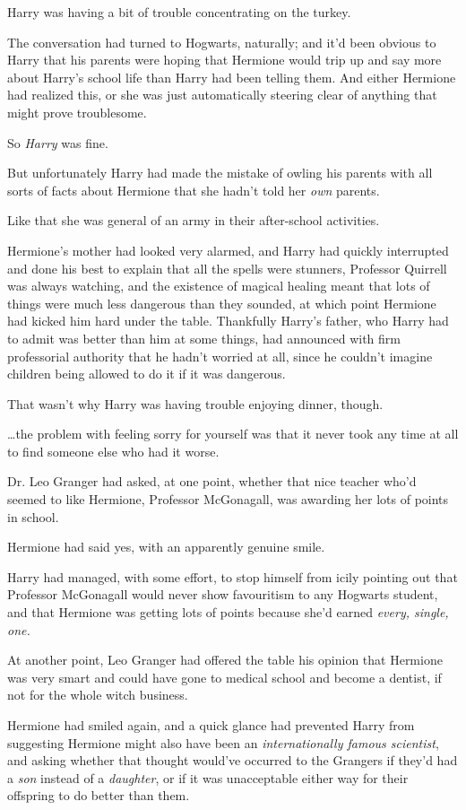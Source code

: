 Harry was having a bit of trouble concentrating on the turkey.

The conversation had turned to Hogwarts, naturally; and it'd been obvious to
Harry that his parents were hoping that Hermione would trip up and say more
about Harry's school life than Harry had been telling them. And either Hermione
had realized this, or she was just automatically steering clear of anything
that might prove troublesome.

So \emph{Harry} was fine.

But unfortunately Harry had made the mistake of owling his parents with all
sorts of facts about Hermione that she hadn't told her \emph{own} parents.

Like that she was general of an army in their after-school activities.

Hermione's mother had looked very alarmed, and Harry had quickly interrupted
and done his best to explain that all the spells were stunners, Professor
Quirrell was always watching, and the existence of magical healing meant that
lots of things were much less dangerous than they sounded, at which point
Hermione had kicked him hard under the table. Thankfully Harry's father, who
Harry had to admit was better than him at some things, had announced with firm
professorial authority that he hadn't worried at all, since he couldn't imagine
children being allowed to do it if it was dangerous.

That wasn't why Harry was having trouble enjoying dinner, though.

{\ldots}the problem with feeling sorry for yourself was that it never took any
time at all to find someone else who had it worse.

Dr. Leo Granger had asked, at one point, whether that nice teacher who'd seemed
to like Hermione, Professor McGonagall, was awarding her lots of points in
school.

Hermione had said yes, with an apparently genuine smile.

Harry had managed, with some effort, to stop himself from icily pointing out
that Professor McGonagall would never show favouritism to any Hogwarts student,
and that Hermione was getting lots of points because she'd earned \emph{every,
single, one.}

At another point, Leo Granger had offered the table his opinion that Hermione
was very smart and could have gone to medical school and become a dentist, if
not for the whole witch business.

Hermione had smiled again, and a quick glance had prevented Harry from
suggesting Hermione might also have been an \emph{internationally famous
scientist}, and asking whether that thought would've occurred to the Grangers
if they'd had a \emph{son} instead of a \emph{daughter}, or if it was
unacceptable either way for their offspring to do better than them.

